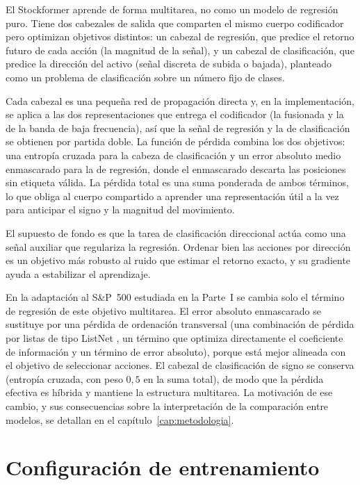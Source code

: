 El Stockformer aprende de forma multitarea, no como un modelo de regresión puro. Tiene dos
cabezales de salida que comparten el mismo cuerpo codificador pero optimizan objetivos
distintos: un cabezal de regresión, que predice el retorno futuro de cada acción (la
magnitud de la señal), y un cabezal de clasificación, que predice la dirección del activo
(señal discreta de subida o bajada), planteado como un problema de clasificación sobre un
número fijo de clases.

Cada cabezal es una pequeña red de propagación directa y, en la implementación, se aplica
a las dos representaciones que entrega el codificador (la fusionada y la de la banda de
baja frecuencia), así que la señal de regresión y la de clasificación se obtienen por
partida doble. La función de pérdida combina los dos objetivos: una entropía cruzada para
la cabeza de clasificación y un error absoluto medio enmascarado para la de regresión,
donde el enmascarado descarta las posiciones sin etiqueta válida. La pérdida total es una
suma ponderada de ambos términos, lo que obliga al cuerpo compartido a aprender una
representación útil a la vez para anticipar el signo y la magnitud del movimiento.

El supuesto de fondo es que la tarea de clasificación direccional actúa como una señal
auxiliar que regulariza la regresión. Ordenar bien las acciones por dirección es un
objetivo más robusto al ruido que estimar el retorno exacto, y su gradiente ayuda a
estabilizar el aprendizaje.

En la adaptación al S\&P~500 estudiada en la Parte~I se cambia solo el término de
regresión de este objetivo multitarea. El error absoluto enmascarado se sustituye por una
pérdida de ordenación transversal (una combinación de pérdida por listas de tipo ListNet
\autocite{cao2007learning}, un término que optimiza directamente el coeficiente de
información y un término de error absoluto), porque está mejor alineada con el objetivo de
seleccionar acciones. El cabezal de clasificación de signo se conserva (entropía cruzada,
con peso $0{,}5$ en la suma total), de modo que la pérdida efectiva es híbrida y mantiene
la estructura multitarea. La motivación de ese cambio, y sus consecuencias sobre la
interpretación de la comparación entre modelos, se detallan en el
capítulo~\ref{cap:metodologia}.

\section{Configuración de entrenamiento}\label{sec:train-config}

